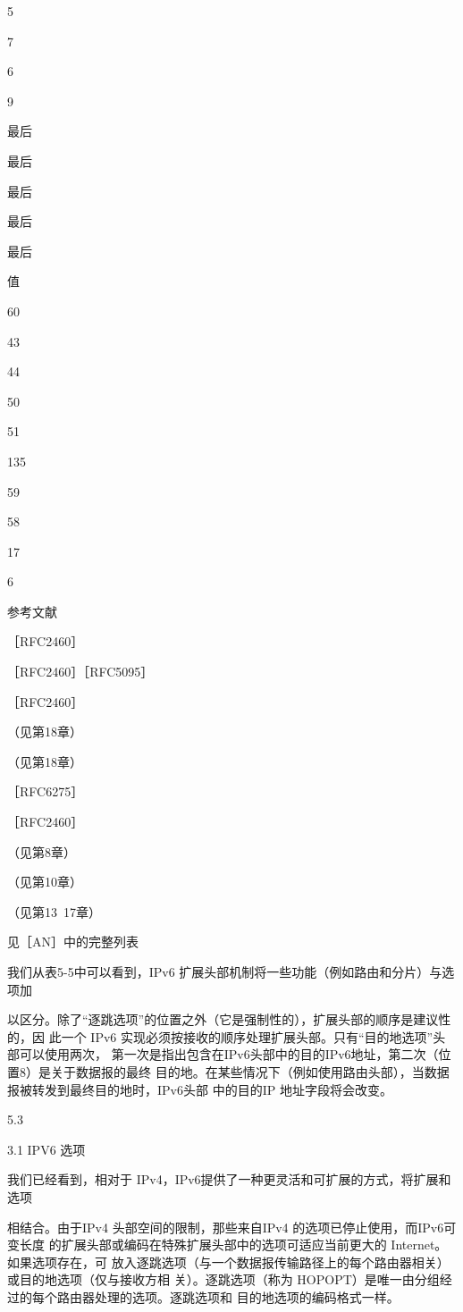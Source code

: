 5

7

6

9

最后

最后

最后

最后

最后

值

60

43

44

50

51

135

59

58

17

6

参考文献

［RFC2460］

［RFC2460］［RFC5095］

［RFC2460］

（见第18章）

（见第18章）

［RFC6275］

［RFC2460］

（见第8章）

（见第10章）

（见第13~17章）

见［AN］中的完整列表

我们从表5-5中可以看到，IPv6 扩展头部机制将一些功能（例如路由和分片）与选项加

以区分。除了“逐跳选项”的位置之外（它是强制性的），扩展头部的顺序是建议性的，因
此一个 IPv6 实现必须按接收的顺序处理扩展头部。只有“目的地选项”头部可以使用两次，
第一次是指出包含在IPv6头部中的目的IPv6地址，第二次（位置8）是关于数据报的最终
目的地。在某些情况下（例如使用路由头部），当数据报被转发到最终目的地时，IPv6头部
中的目的IP 地址字段将会改变。

5.3

3.1 IPV6 选项

我们已经看到，相对于 IPv4，IPv6提供了一种更灵活和可扩展的方式，将扩展和选项

相结合。由于IPv4 头部空间的限制，那些来自IPv4 的选项已停止使用，而IPv6可变长度
的扩展头部或编码在特殊扩展头部中的选项可适应当前更大的 Internet。如果选项存在，可
放入逐跳选项（与一个数据报传输路径上的每个路由器相关）或目的地选项（仅与接收方相
关）。逐跳选项（称为 HOPOPT）是唯一由分组经过的每个路由器处理的选项。逐跳选项和
目的地选项的编码格式一样。

